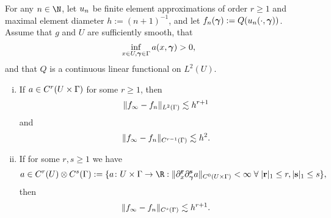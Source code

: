 \begin{pro}
	\label{pro:finite}
	For any $n\in\N$, let $u_{n}$ be finite element approximations of order $r\geq 1$ and maximal element diameter $h:=(n+1)^{-1}$, and let $f_{n}(\bm{\gamma}):=Q(u_n(\cdot,\bm{\gamma}))$.
	Assume that $g$ and $U$ are sufficiently smooth, that 
	\begin{equation}
		\inf_{x\in U,\bm{\gamma}\in\Gamma}a(x,\bm{\gamma})>0,
	\end{equation}
	and that $Q$ is a continuous linear functional on $L^2(U)$.
	
	
	
	\begin{enumerate}[(i)]
		\item If $a\in C^{r}(U\times\Gamma)$ for some $r\geq 1$, then  %
		\begin{equation*}
		\|f_{\infty}-f_{n}\|_{L^2(\Gamma)}\lesssim h^{r+1}
		\end{equation*}
		and
		\begin{equation*}
		\|f_{\infty}-f_{n}\|_{C^{r-1}(\Gamma)}\lesssim h^{2}.
		\end{equation*}
		\item If for some $r,s\geq 1$ we have
		\begin{equation}
		\label{eq:tensor}
		\begin{split}
		a\in C^{r}(U)\otimes C^{s}(\domPS):=\{a\colon U\times \domPS\to\R :  \norm{\partial_{x}^{\mathbf{r}}\partial_{\psmi}^{\mathbf{s}}a}{C^0(U\times\domPS)}<\infty\;\forall\;|\mathbf{r}|_{1}\leq r,|\mathbf{s}|_{1}\leq s\}
		,
		\end{split}
		\end{equation} then 
		\begin{equation*}
		\|f_{\infty}-f_{n}\|_{C^{s}(\Gamma)}\lesssim h^{r+1}.
		\end{equation*}
		
	\end{enumerate}
\end{pro}
